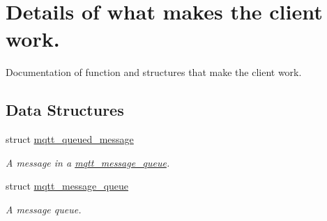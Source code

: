 \hypertarget{group__details}{}\section{Details of what makes the client work.}
\label{group__details}


Documentation of function and structures that make the client work.  


\subsection*{Data Structures}
\begin{DoxyCompactItemize}
\item 
struct \hyperlink{structmqtt__queued__message}{mqtt\+\_\+queued\+\_\+message}
\begin{DoxyCompactList}\small\item\em A message in a \hyperlink{structmqtt__message__queue}{mqtt\+\_\+message\+\_\+queue}. \end{DoxyCompactList}\item 
struct \hyperlink{structmqtt__message__queue}{mqtt\+\_\+message\+\_\+queue}
\begin{DoxyCompactList}\small\item\em A message queue. \end{DoxyCompactList}\end{DoxyCompactItemize}
